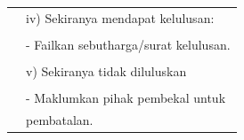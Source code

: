 \documentclass[
]{article}
\begin{document}
\begin{longtable}[]{@{}ll@{}}
\begin{minipage}[t]{0.23\columnwidth}
\strut
\end{minipage} & \begin{minipage}[t]{0.71\columnwidth}\raggedright
iv) Sekiranya mendapat kelulusan:\strut
\end{minipage}\tabularnewline
\begin{minipage}[t]{0.23\columnwidth}\raggedright
\strut
\end{minipage} & \begin{minipage}[t]{0.71\columnwidth}\raggedright
\strut
\end{minipage}\tabularnewline
\begin{minipage}[t]{0.23\columnwidth}\raggedright
\strut
\end{minipage} & \begin{minipage}[t]{0.71\columnwidth}\raggedright
- Failkan sebutharga/surat kelulusan.\strut
\end{minipage}\tabularnewline
\begin{minipage}[t]{0.23\columnwidth}\raggedright
\strut
\end{minipage} & \begin{minipage}[t]{0.71\columnwidth}\raggedright
\strut
\end{minipage}\tabularnewline
\begin{minipage}[t]{0.23\columnwidth}\raggedright
\strut
\end{minipage} & \begin{minipage}[t]{0.71\columnwidth}\raggedright
v) Sekiranya tidak diluluskan\strut
\end{minipage}\tabularnewline
\begin{minipage}[t]{0.23\columnwidth}\raggedright
\strut
\end{minipage} & \begin{minipage}[t]{0.71\columnwidth}\raggedright
\strut
\end{minipage}\tabularnewline
\begin{minipage}[t]{0.23\columnwidth}\raggedright
\strut
\end{minipage} & \begin{minipage}[t]{0.71\columnwidth}\raggedright
- Maklumkan pihak pembekal untuk\strut
\end{minipage}\tabularnewline
\begin{minipage}[t]{0.23\columnwidth}\raggedright
\strut
\end{minipage} & \begin{minipage}[t]{0.71\columnwidth}\raggedright
pembatalan.\strut
\end{minipage}\tabularnewline

\end{longtable}
\end{document}
